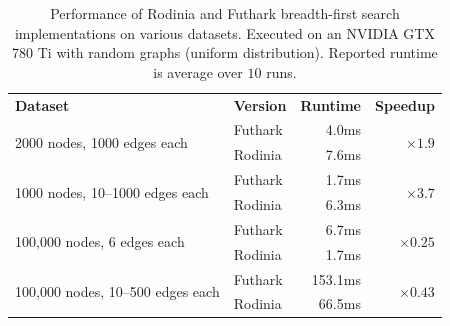 \begin{table}
  \centering
  \begin{tabular}{llrr}
    \textbf{Dataset} & \textbf{Version} & \textbf{Runtime} & \textbf{Speedup} \\

    \multirow{2}{*}{2000 nodes, 1000 edges each} & Futhark & 4.0ms & \multirow{2}{*}{$\times1.9$} \\\cline{2-3}
                     & Rodinia & 7.6ms \\\hline

    \multirow{2}{*}{1000 nodes, 10--1000 edges each} & Futhark & 1.7ms & \multirow{2}{*}{$\times3.7$} \\\cline{2-3}
                     & Rodinia & 6.3ms \\\hline

    \multirow{2}{*}{100,000 nodes, 6 edges each} & Futhark & 6.7ms & \multirow{2}{*}{$\times0.25$} \\\cline{2-3}
                     & Rodinia & 1.7ms \\\hline

    \multirow{2}{*}{100,000 nodes, 10--500 edges each} & Futhark & 153.1ms & \multirow{2}{*}{$\times0.43$} \\\cline{2-3}
                     & Rodinia & 66.5ms \\\hline

  \end{tabular}
  \caption{Performance of Rodinia and Futhark breadth-first search
    implementations on various datasets. Executed on an NVIDIA GTX 780
    Ti with random graphs (uniform distribution).  Reported runtime is
    average over $10$ runs.}
  \label{fig:bfs-speedup}
\end{table}

